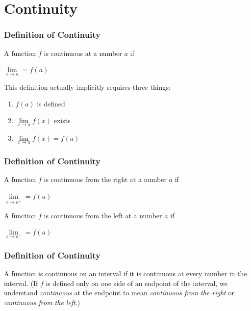 
\section{Continuity}
\begin{frame}
    \frametitle{Definition of Continuity}
    A function $f$ is continuous at a number $a$ if
    \begin{center}
        $\lim\limits_{\textit{x} \to a} = f(a)$
    \end{center}
    This definition actually implicitly requires three things:
    \begin{enumerate}
        \item $f(a)$ is defined
        \item $\lim\limits_{\textit{x} \to a}f(x)$ exists
        \item $\lim\limits_{\textit{x} \to a}f(x) = f(a)$
    \end{enumerate}

    \frametitle{Definition of Continuity}
    A function $f$ is continuous from the right at a number $a$ if
    \begin{center}
        $\lim\limits_{\textit{x} \to a^{+}} = f(a)$
    \end{center}
    A function $f$ is continuous from the left at a number $a$ if
    \begin{center}
        $\lim\limits_{\textit{x} \to a^{-}} = f(a)$
    \end{center}
\end{frame}
\begin{frame}
    \frametitle{Definition of Continuity}
    A function is continuous on an interval if it is continuous at \alert{every number in the interval}. (If $f$ is defined only on one side of an endpoint of the interval, we understand \textit{continuous} at the endpoint to mean \textit{continuous from the right} or \textit{continuous from the left}.)
\end{frame}

